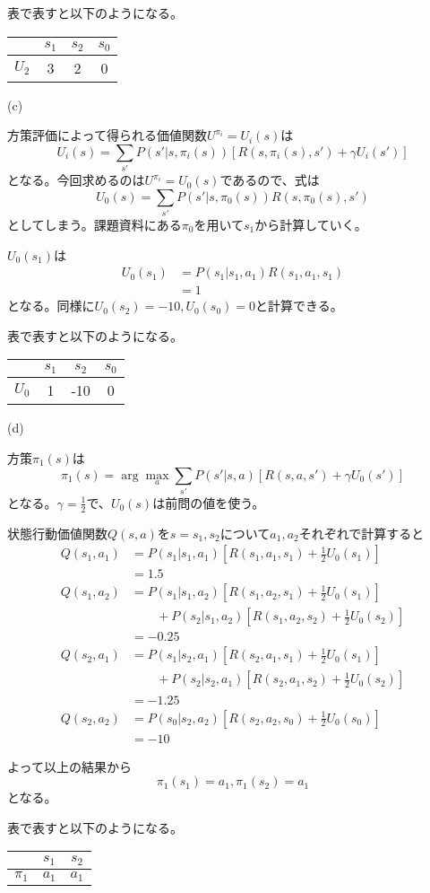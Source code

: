 \documentclass[a4paper,11pt,dvipdfmx]{jsarticle}
\begin{document}
表で表すと以下のようになる。
\begin{center}
    \begin{tabular}[h]{|c|c|c|c|} \hline
              & $s_1$ & $s_2$ & $s_0$ \\ \hline
        $U_2$ &   3   &   2   &   0   \\ \hline
    \end{tabular}
\end{center}

(c)

方策評価によって得られる価値関数$U^{\pi_i}=U_i(s)$は
\[U_i(s)=\sum_{s'}P(s'|s,\pi_i(s))[R(s,\pi_i(s),s')+\gamma U_i(s')]\]
となる。今回求めるのは$U^{\pi_i}=U_0(s)$であるので、式は
\[U_0(s)=\sum_{s'}P(s'|s,\pi_0(s))R(s,\pi_0(s),s')\]
としてしまう。課題資料にある$\pi_0$を用いて$s_1$から計算していく。

$U_0(s_1)$は
\begin{align*}
U_0(s_1) & =P(s_1|s_1,a_1)R(s_1,a_1,s_1)\\
         & =1
\end{align*}
となる。同様に$U_0(s_2)=-10,U_0(s_0)=0$と計算できる。

表で表すと以下のようになる。
\begin{center}
    \begin{tabular}[h]{|c|c|c|c|} \hline
              & $s_1$ & $s_2$ & $s_0$ \\ \hline
        $U_0$ &   1   &  -10  &   0   \\ \hline
    \end{tabular}
\end{center}

(d)

方策$\pi_1(s)$は
\[\pi_1(s)=\arg \max_{a}\sum_{s'}P(s'|s,a)[R(s,a,s')+\gamma U_0(s')]\]
となる。$\gamma = \frac{1}{2}$で、$U_0(s)$は前問の値を使う。

状態行動価値関数$Q(s,a)$を$s=s_1,s_2$について$a_1,a_2$それぞれで計算すると
\begin{align*}
    Q(s_1,a_1) & =P(s_1|s_1,a_1)[R(s_1,a_1,s_1)+\frac{1}{2}U_0(s_1)] \\
               & =1.5\\
    Q(s_1,a_2) & =P(s_1|s_1,a_2)[R(s_1,a_2,s_1)+\frac{1}{2}U_0(s_1)] \\ 
               & \qquad + P(s_2|s_1,a_2)[R(s_1,a_2,s_2)+\frac{1}{2}U_0(s_2)]\\
               & =-0.25\\
    Q(s_2,a_1) & =P(s_1|s_2,a_1)[R(s_2,a_1,s_1)+\frac{1}{2}U_0(s_1)] \\
               & \qquad + P(s_2|s_2,a_1)[R(s_2,a_1,s_2)+\frac{1}{2}U_0(s_2)]\\
               & =-1.25\\
    Q(s_2,a_2) & =P(s_0|s_2,a_2)[R(s_2,a_2,s_0)+\frac{1}{2}U_0(s_0)] \\
               & =-10
\end{align*}

よって以上の結果から
\[\pi_1(s_1)=a_1,\pi_1(s_2)=a_1\]
となる。

表で表すと以下のようになる。
\begin{center}
    \begin{tabular}[h]{|c|c|c|} \hline
                & $s_1$ & $s_2$ \\ \hline
        $\pi_1$ & $a_1$ & $a_1$ \\ \hline
    \end{tabular}
\end{center}
\end{document}
